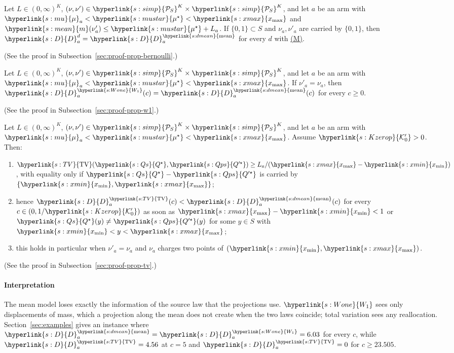 \documentclass[11pt]{article}
\newcommand{\sy}[2]{{\hyperlink{#1}{#2}}}
\newcommand{\term}[2]{\hyperlink{#1}{#2}}
\newcommand{\xmax}{\sy{s:xmax}{x_{\max}}}
\newcommand{\xmin}{\sy{s:xmin}{x_{\min}}}
\newcommand{\Simp}{\sy{s:simp}{\mathcal{P}_{S}}}
\newcommand{\mean}{\sy{s:mean}{m}}
\newcommand{\TV}{\sy{s:TV}{\mathrm{TV}}}
\newcommand{\Wone}{\sy{s:Wone}{W_{1}}}
\newcommand{\dmean}{\sy{s:dmean}{\mathrm{mean}}}
\newcommand{\propM}{\term{s:M}{(M)}}
\newcommand{\mk}{\sy{s:mu}{\mu}}
\newcommand{\mus}{\sy{s:mustar}{\mu^{\star}}}
\newcommand{\Dc}{\sy{s:D}{D}}
\newcommand{\Kop}{\sy{s:Kzerop}{\mathcal{K}'_{0}}}
\newcommand{\Qs}{\sy{s:Qs}{Q^{\star}}}
\newcommand{\Qps}{\sy{s:Qps}{Q'^{\star}}}
\begin{document}
\begin{proposition}\label{prop:bernoulli}
Let $L\in(0,\infty)^K$, $(\nu,\nu')\in\Simp^K\times\Simp^K$, and let $a$ be an arm with
$\mk_a<\mus<\xmax$ and $\mean(\nu'_a)\le\mus+L_a$. If $\{0,1\}\subset S$ and $\nu_a,\nu'_a$ are
carried by $\{0,1\}$, then $\Dc^d_a=\Dc^{\dmean}_a$ for every $d$ with \propM{}.
\end{proposition}

(See the proof in Subsection~\ref{sec:proof-prop-bernoulli}.)

\begin{proposition}[$\Wone$: no gain without drift]\label{prop:w1}
Let $L\in(0,\infty)^K$, $(\nu,\nu')\in\Simp^K\times\Simp^K$, and let $a$ be an arm with
$\mk_a<\mus<\xmax$. If $\nu'_a=\nu_a$, then $\Dc^{\Wone}_a(c)=\Dc^{\dmean}_a(c)$ for every $c\ge0$.
\end{proposition}

(See the proof in Subsection~\ref{sec:proof-prop-w1}.)

\begin{proposition}\label{prop:tv}
Let $L\in(0,\infty)^K$, $(\nu,\nu')\in\Simp^K\times\Simp^K$, and let $a$ be an arm with
$\mk_a<\mus<\xmax$. Assume $\Kop>0$. Then:
\begin{enumerate}
\item[(a)] $\TV(\Qs,\Qps)\ge L_a/(\xmax-\xmin)$, with equality only if $\Qs-\Qps$ is carried by
  $\{\xmin,\xmax\}$;
\item[(b)] hence $\Dc^{\TV}_a(c)<\Dc^{\dmean}_a(c)$ for every $c\in(0,1/\Kop)$ as soon as
  $\xmax-\xmin<1$ or $\Qs(y)\ne\Qps(y)$ for some $y\in S$ with $\xmin<y<\xmax$;
\item[(c)] this holds in particular when $\nu'_a=\nu_a$ and $\nu_a$ charges two points of
  $(\xmin,\xmax)$.
\end{enumerate}
\end{proposition}

(See the proof in Subsection~\ref{sec:proof-prop-tv}.)

\paragraph{Interpretation} The mean model loses exactly the information of the source law that the
projections use. $\Wone$ sees only displacements of mass, which a projection along the mean does not
create when the two laws coincide; total variation sees any reallocation.
Section~\ref{sec:examples} gives an instance where $\Dc^{\dmean}_a=\Dc^{\Wone}_a=6.03$ for every $c$,
while $\Dc^{\TV}_a=4.56$ at $c=5$ and $\Dc^{\TV}_a=0$ for $c\ge23.505$.
\end{document}

